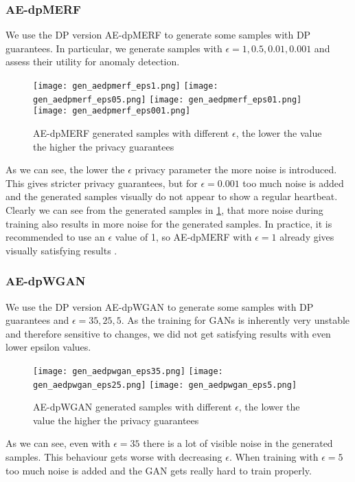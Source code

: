 \subsubsection*{AE-dpMERF}
We use the DP version AE-dpMERF to generate some samples with DP guarantees. In particular, we generate samples with $\epsilon=1, 0.5, 0.01, 0.001$ and assess their utility for anomaly detection.

\begin{figure}[H]
    \centering
    \texttt{[image: gen\_aedpmerf\_eps1.png]}
    \texttt{[image: gen\_aedpmerf\_eps05.png]}
    \texttt{[image: gen\_aedpmerf\_eps01.png]}
    \texttt{[image: gen\_aedpmerf\_eps001.png]}
    \caption{AE-dpMERF generated samples with different $\epsilon$, the lower the value the higher the privacy guarantees}
    \label{fig:gen_aedpmerf}
\end{figure}

As we can see, the lower the $\epsilon$ privacy parameter the more noise is introduced. This gives stricter privacy guarantees, but for $\epsilon=0.001$ too much noise is added and the generated samples visually do not appear to show a regular heartbeat. Clearly we can see from the generated samples in \cref{fig:gen_aedpmerf}, that more noise during training also results in more noise for the generated samples.  In practice, it is recommended to use an $\epsilon$ value of 1, so AE-dpMERF with $\epsilon=1$ already gives visually satisfying results \parencite{dwork2019differential}.

\subsubsection*{AE-dpWGAN}
We use the DP version AE-dpWGAN to generate some samples with DP guarantees and $\epsilon=35, 25, 5$. As the training for GANs is inherently very unstable and therefore sensitive to changes, we did not get satisfying results with even lower epsilon values. 

\begin{figure}[H]
    \centering
    \texttt{[image: gen\_aedpwgan\_eps35.png]}
    \texttt{[image: gen\_aedpwgan\_eps25.png]}
    \texttt{[image: gen\_aedpwgan\_eps5.png]}
    \caption{AE-dpWGAN generated samples with different $\epsilon$, the lower the value the higher the privacy guarantees}
    \label{fig:enter-label}
\end{figure}

As we can see, even with $\epsilon=35$ there is a lot of visible noise in the generated samples. This behaviour gets worse with decreasing $\epsilon$. When training with $\epsilon=5$ too much noise is added and the GAN gets really hard to train properly. 


